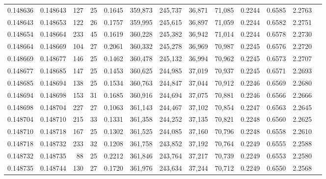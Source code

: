 \begin{tabular}{rrrrrrrrrrrrr}
0.148636 & 0.148643 & 127 &  25 &                                     0.1645 & 359,873 & 245,737 &  36,871 &  71,085 & 0.2244 & 0.6585 & 2.2763 \\
0.148643 & 0.148653 & 122 &  26 &                                     0.1757 & 359,995 & 245,615 &  36,897 &  71,059 & 0.2244 & 0.6582 & 2.2751 \\
0.148654 & 0.148664 & 233 &  45 &                                     0.1619 & 360,228 & 245,382 &  36,942 &  71,014 & 0.2244 & 0.6578 & 2.2730 \\
0.148664 & 0.148669 & 104 &  27 &                                     0.2061 & 360,332 & 245,278 &  36,969 &  70,987 & 0.2245 & 0.6576 & 2.2720 \\
0.148669 & 0.148677 & 146 &  25 &                                     0.1462 & 360,478 & 245,132 &  36,994 &  70,962 & 0.2245 & 0.6573 & 2.2707 \\
0.148677 & 0.148685 & 147 &  25 &                                     0.1453 & 360,625 & 244,985 &  37,019 &  70,937 & 0.2245 & 0.6571 & 2.2693 \\
0.148685 & 0.148694 & 138 &  25 &                                     0.1534 & 360,763 & 244,847 &  37,044 &  70,912 & 0.2246 & 0.6569 & 2.2680 \\
0.148694 & 0.148698 & 153 &  31 &                                     0.1685 & 360,916 & 244,694 &  37,075 &  70,881 & 0.2246 & 0.6566 & 2.2666 \\
0.148698 & 0.148704 & 227 &  27 &                                     0.1063 & 361,143 & 244,467 &  37,102 &  70,854 & 0.2247 & 0.6563 & 2.2645 \\
0.148704 & 0.148710 & 215 &  33 &                                     0.1331 & 361,358 & 244,252 &  37,135 &  70,821 & 0.2248 & 0.6560 & 2.2625 \\
0.148710 & 0.148718 & 167 &  25 &                                     0.1302 & 361,525 & 244,085 &  37,160 &  70,796 & 0.2248 & 0.6558 & 2.2610 \\
0.148718 & 0.148732 & 233 &  32 &                                     0.1208 & 361,758 & 243,852 &  37,192 &  70,764 & 0.2249 & 0.6555 & 2.2588 \\
0.148732 & 0.148735 &  88 &  25 &                                     0.2212 & 361,846 & 243,764 &  37,217 &  70,739 & 0.2249 & 0.6553 & 2.2580 \\
0.148735 & 0.148744 & 130 &  27 &                                     0.1720 & 361,976 & 243,634 &  37,244 &  70,712 & 0.2249 & 0.6550 & 2.2568 \\

\end{tabular}

